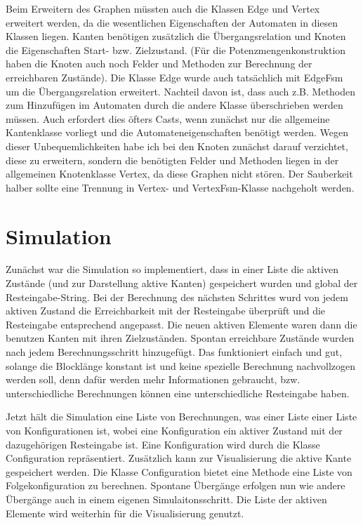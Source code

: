 Beim Erweitern des Graphen müssten auch die Klassen Edge und Vertex erweitert werden, da die wesentlichen Eigenschaften der Automaten in diesen Klassen liegen. Kanten benötigen zusätzlich die Übergangsrelation und Knoten die Eigenschaften Start- bzw. Zielzustand. (Für die Potenzmengenkonstruktion haben die Knoten auch noch Felder und Methoden zur Berechnung der erreichbaren Zustände). Die Klasse Edge wurde auch tatsächlich mit EdgeFsm um die Übergangsrelation erweitert. Nachteil davon ist, dass auch z.B. Methoden zum Hinzufügen im Automaten durch die andere Klasse überschrieben werden müssen. Auch erfordert dies öfters Casts, wenn zunächst nur die allgemeine Kantenklasse vorliegt und die Automateneigenschaften benötigt werden. Wegen dieser Unbequemlichkeiten habe ich bei den Knoten zunächst darauf verzichtet, diese zu erweitern, sondern die benötigten Felder und Methoden liegen in der allgemeinen Knotenklasse Vertex, da diese Graphen nicht stören. Der Sauberkeit halber sollte eine Trennung in Vertex- und VertexFsm-Klasse nachgeholt werden.
\section{Simulation}
Zunächst war die Simulation so implementiert, dass in einer Liste die aktiven Zustände (und zur Darstellung aktive Kanten) gespeichert wurden und global der Resteingabe-String. Bei der Berechnung des nächsten Schrittes wurd von jedem aktiven Zustand die Erreichbarkeit mit der Resteingabe überprüft und die Resteingabe entsprechend angepasst. Die neuen aktiven Elemente waren dann die benutzen Kanten mit ihren Zielzuständen. Spontan erreichbare Zustände wurden nach jedem Berechnungsschritt hinzugefügt. Das funktioniert einfach und gut, solange die Blocklänge konstant ist und keine spezielle Berechnung nachvollzogen werden soll, denn dafür werden mehr Informationen gebraucht, bzw. unterschiedliche Berechnungen können eine unterschiedliche Resteingabe haben.

Jetzt hält die Simulation eine Liste von Berechnungen, was einer Liste einer Liste von Konfigurationen ist, wobei eine Konfiguration ein aktiver Zustand mit der dazugehörigen Resteingabe ist. Eine Konfiguration wird durch die Klasse Configuration repräsentiert. Zusätzlich kann zur Visualisierung die aktive Kante gespeichert werden. Die Klasse Configuration bietet eine Methode eine Liste von Folgekonfiguration zu berechnen. Spontane Übergänge erfolgen nun wie andere Übergänge auch in einem eigenen Simulaitonsschritt. Die Liste der aktiven Elemente wird weiterhin für die Visualisierung genutzt.

